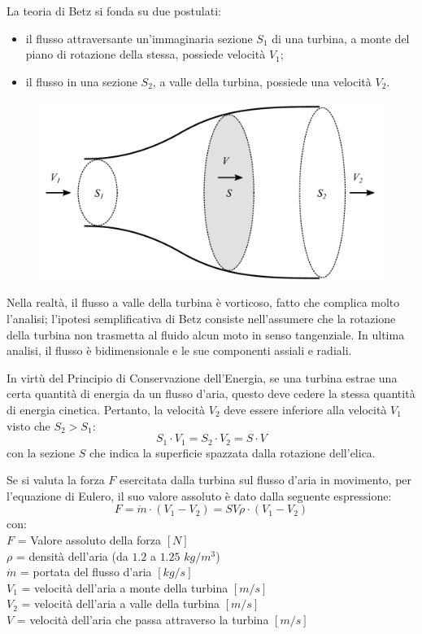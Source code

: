 La teoria di Betz si fonda su due postulati:
\begin{itemize}
\item il flusso attraversante un'immaginaria sezione $S_1$ di una turbina, a monte del piano di rotazione della stessa, possiede velocità $V_1$;
\item il flusso in una sezione $S_2$, a valle della turbina, possiede una velocità $V_2$.
\end{itemize}
\begin{figure}
\centering
  \includegraphics[width=.6\textwidth]{fig/Betz.pdf}
\caption{}
\label{}
\end{figure}
Nella realtà, il flusso a valle della turbina è vorticoso, fatto che complica molto l'analisi; l'ipotesi semplificativa di Betz consiste nell'assumere che la rotazione della turbina non trasmetta al fluido alcun moto in senso tangenziale. In ultima analisi, il flusso è bidimensionale e le sue componenti assiali e radiali. 

In virtù del Principio di Conservazione dell'Energia, se una turbina estrae una certa quantità di energia da un flusso d'aria, questo deve cedere la stessa quantità di energia cinetica. Pertanto, la velocità $V_2$ deve essere inferiore alla velocità $V_1$ visto che $S_2>S_1$:
\begin{equation}
S_1 \cdot V_1 = S_2 \cdot V_2 = S \cdot V
\end{equation}
con la sezione $S$ che indica la superficie spazzata dalla rotazione dell'elica.

Se si valuta la forza $F$ esercitata dalla turbina sul flusso d'aria in movimento, per l'equazione di Eulero, il suo valore assoluto è dato dalla seguente espressione:
\begin{equation}
F = \dot{m} \cdot \left( V_1 - V_2 \right) = S V \rho \cdot \left( V_1 - V_2 \right)
\end{equation}
con:\\[1mm]
$F$ = Valore assoluto della forza $[N]$\\
$\rho$ = densità dell'aria (da $1.2$ a $1.25$ $kg/m^3$)\\
$\dot{m}$ = portata del flusso d'aria $[kg/s]$\\
$V_1$ = velocità dell'aria a monte della turbina $[m/s]$\\
$V_2$ = velocità dell'aria a valle della turbina $[m/s]$\\
$V$ = velocità dell'aria che passa attraverso la turbina $[m/s]$\\

